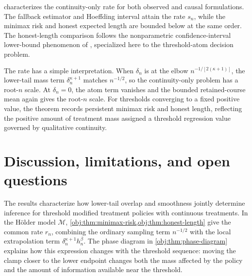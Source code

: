 \documentclass[11pt]{article}
\begin{document}

 characterizes the continuity-only rate for both observed and causal formulations. The fallback estimator and Hoeffding interval attain the rate \(s_n\), while the minimax risk and honest expected length are bounded below at the same order. The honest-length comparison follows the nonparametric confidence-interval lower-bound phenomenon of \citet{Low1997NonparametricConfidenceIntervals}, specialized here to the threshold-atom decision problem.

The rate has a simple interpretation. When \(\delta_n\) is at the elbow \(n^{-1/[2(\kappa+1)]}\), the lower-tail mass term \(\delta_n^{\kappa+1}\) matches \(n^{-1/2}\), so the continuity-only problem has a root-\(n\) scale. At \(\delta_n=0\), the atom term vanishes and the bounded retained-course mean again gives the root-\(n\) scale. For thresholds converging to a fixed positive value, the theorem records persistent minimax risk and honest length, reflecting the positive amount of treatment mass assigned a threshold regression value governed by qualitative continuity.


\section{Discussion, limitations, and open questions}
\label{sec:discussion-open-questions}

The results characterize how lower-tail overlap and smoothness jointly determine inference for threshold modified treatment policies with continuous treatments. In the Hölder model \(\mathcal M\), \cref{obj:thm:minimax-risk,obj:thm:honest-length} give the common rate \(r_n\), combining the ordinary sampling term \(n^{-1/2}\) with the local extrapolation term \(\delta_n^{\kappa+1}h_n^\beta\). The phase diagram in \cref{obj:thm:phase-diagram} explains how this expression changes with the threshold sequence: moving the clamp closer to the lower endpoint changes both the mass affected by the policy and the amount of information available near the threshold.
\end{document}
